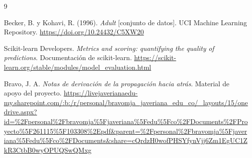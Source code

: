 \documentclass[12pt,letterpaper,oneside]{article}
\begin{document}
\begin{thebibliography}{9}

Becker, B. y Kohavi, R. (1996). \textit{Adult} [conjunto de datos]. UCI Machine Learning Repository. \url{https://doi.org/10.24432/C5XW20}

Scikit-learn Developers. \textit{Metrics and scoring: quantifying the quality of predictions}. Documentación de scikit-learn. \url{https://scikit-learn.org/stable/modules/model_evaluation.html}

Bravo, J. A. \textit{Notas de derivación de la propagación hacia atrás}. Material de apoyo del proyecto. \url{https://livejaverianaedu-my.sharepoint.com/:b:/r/personal/bravomja_javeriana_edu_co/_layouts/15/onedrive.aspx?id=%2Fpersonal%2Fbravomja%5Fjaveriana%5Fedu%5Fco%2FDocuments%2FProyecto%5F261115%5F103308%2Epdf&parent=%2Fpersonal%2Fbravomja%5Fjaveriana%5Fedu%5Fco%2FDocuments&share=cQrdzH0wofPHSYfynVjj6Zm1EgUC1ZkR3CtbB0wyOPUQSwQMxg}

\end{thebibliography}
\end{document}
